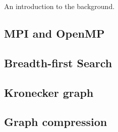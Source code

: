 An introduction to the background.
\subsection{MPI and OpenMP}
\subsection{Breadth-first Search}
\subsection{Kronecker graph}
\subsection{Graph compression}
